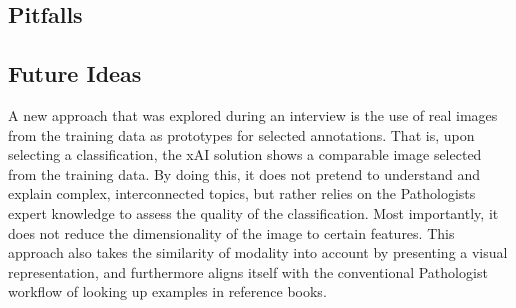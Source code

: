 %

\subsection{Pitfalls}

\subsection{Future Ideas}
A new approach that was explored during an interview is the use of real images from the training data as prototypes for selected annotations. That is, upon selecting a classification, the xAI solution shows a comparable image selected from the training data. By doing this, it does not pretend to understand and explain complex, interconnected topics, but rather relies on the Pathologists expert knowledge to assess the quality of the classification. Most importantly, it does not reduce the dimensionality of the image to certain features.
This approach also takes the similarity of modality into account by presenting a visual representation, and furthermore aligns itself with
the conventional Pathologist workflow of looking up examples in reference books.



